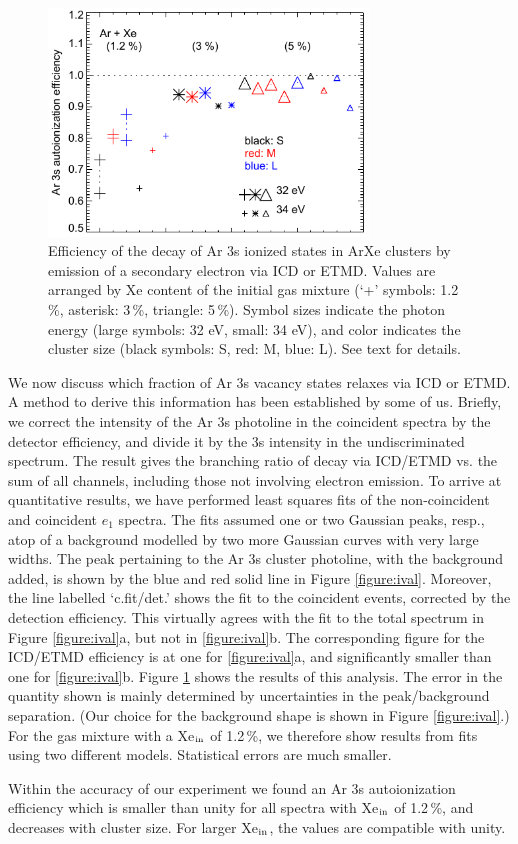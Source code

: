 \begin{figure}[ht]
 \centering
 \includegraphics[width=8.5cm]{pics/figure_eff.pdf}
 \caption{
Efficiency of the decay of Ar 3s ionized states in ArXe clusters by emission of a secondary electron via ICD or ETMD. Values are arranged by Xe content of the initial gas mixture (`+' symbols: 1.2\,\%, asterisk: 3\,\%, triangle: 5\,\%). Symbol sizes indicate the photon energy (large symbols: 32 eV, small: 34 eV), and color indicates the cluster size (black symbols: S, red: M, blue: L). See text for details.
}
 \label{figure:eff}
\end{figure}
%
We now discuss which fraction of Ar 3s vacancy states relaxes via ICD or ETMD.
A method to derive this information has been established by some of us.\cite{foerstel_2013}
Briefly, we correct the intensity of the Ar 3s photoline in the coincident spectra by the detector efficiency, and divide it by the 3s intensity in the undiscriminated spectrum.
The result gives the branching ratio of decay via ICD/ETMD vs. the sum of all channels, including those not involving electron emission.
To arrive at quantitative results, we have performed least squares fits of the non-coincident and coincident $e_1$ spectra.
The fits assumed one or two Gaussian peaks, resp., atop of a background modelled by two more Gaussian curves with very large widths.
The peak pertaining to the Ar 3s cluster photoline, with the background added, is shown by the blue and red solid line in Figure \ref{figure:ival}.
Moreover, the line labelled `c.fit/det.' shows the fit to the coincident events, corrected by the detection efficiency. 
This virtually agrees with the fit to the total spectrum in Figure \ref{figure:ival}a, but not in \ref{figure:ival}b. The corresponding figure for the ICD/ETMD efficiency is at one for \ref{figure:ival}a, and significantly smaller than one for \ref{figure:ival}b.
Figure \ref{figure:eff} shows the results of this analysis.
The error in the quantity shown is mainly determined by uncertainties in the peak/background separation.
(Our choice for the background shape is shown in Figure \ref{figure:ival}.)
For the gas mixture with a Xe$_{\rm in}$ of 1.2\,\%, we therefore show results from fits using two different models.
Statistical errors are much smaller.

Within the accuracy of our experiment we found an Ar 3s autoionization efficiency which is smaller than unity for all spectra with Xe$_{\rm in}$ of 1.2\,\%, and decreases with cluster size. 
For larger Xe$_{\rm in}$, the values are compatible with unity.
